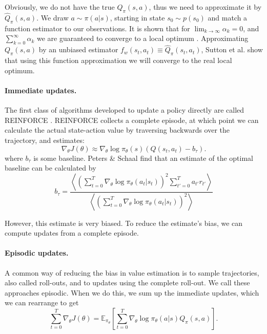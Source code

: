 Obviously, we do not have the true $Q_\pi(s,a)$, thus we need to approximate it by $\hat{Q}_\pi(s,a)$. 
We draw $a \sim \pi(a|s)$, starting in state $s_0 \sim p(s_0)$ and match a function estimator to our observations.
It is shown that for $\lim_{k\to\infty}\alpha_k = 0$, and $\sum_{k=0}^\infty \alpha_k$ we are guaranteed to converge to a local optimum \cite{Sutton:1999:PGM:3009657.3009806}.
Approximating $Q_\pi(s,a)$ by an unbiased estimator $f_w(s_t, a_t) \equiv \hat{Q}_\pi(s_t, a_t)$, Sutton et al. \cite{Sutton:1999:PGM:3009657.3009806} show that using this function approximation we will converge to the real local optimum.

\paragraph{Immediate updates.} 
The first class of algorithms developed to update a policy directly are called REINFORCE \cite{Williams92simplestatistical}.
REINFORCE collects a complete episode, at which point we can calculate the actual state-action value by traversing backwards over the trajectory, and estimates:
\begin{equation}
	\nabla_\theta J(\theta) \approx \nabla_\theta\log\pi_\theta(s) \left(Q(s_t,a_t) - b_\tau \right).
	\label{eqn:reinforce}
\end{equation}
where $b_\tau$ is some baseline. 
Peters \& Schaal \cite{4867} find that an estimate of the optimal baseline can be calculated by
\begin{equation}
	b_\tau = \frac
		{\left\langle 
			\left(\sum_{t=0}^T \nabla_\theta \log\pi_\theta(a_t|s_t) \right)^2 \sum_{t'=0}^T a_{t'} r_{t'} 
		\right\rangle}
		{\left\langle
			\left(\sum_{t=0}^T \nabla_\theta \log\pi_\theta(a_t|s_t) \right)^2
		\right\rangle}
\end{equation}

However, this estimate is very biased.
To reduce the estimate's bias, we can compute updates from a complete episode.

\paragraph{Episodic updates.} 
A common way of reducing the bias in value estimation is to sample trajectories, also called roll-outs, and to updates using the complete roll-out. 
We call these approaches episodic. 
When we do this, we sum up the immediate updates, which we can rearrange to get
\begin{equation}
  \sum_{t=0}^T \nabla_\theta J(\theta) = \mathbb{E}_{\pi_\theta}\left[\sum_{t=0}^T \nabla_\theta{\log\pi_\theta(a|s)}Q_\pi(s,a)\right].
  \label{eqn:egrad}
\end{equation}

